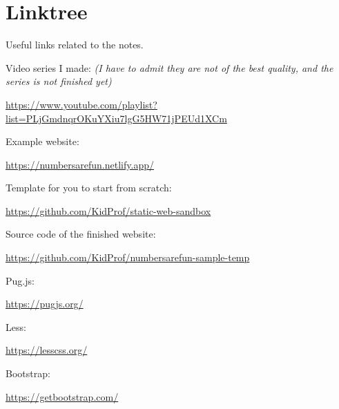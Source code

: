 \newpage
\section{Linktree}

Useful links related to the notes.
\vspace{6mm}

Video series I made: \textit{(I have to admit they are not of the best quality, and the series is not finished yet)}

\url{https://www.youtube.com/playlist?list=PLjGmdnqrOKuYXiu7lgG5HW71jPEUd1XCm}
\vspace{6mm}

Example website:

\url{https://numbersarefun.netlify.app/}
\vspace{6mm}

Template for you to start from scratch:

\url{https://github.com/KidProf/static-web-sandbox}
\vspace{6mm}

Source code of the finished website:

\url{https://github.com/KidProf/numbersarefun-sample-temp}
\vspace{6mm}

Pug.js: 

\url{https://pugjs.org/}
\vspace{6mm}

Less: 

\url{https://lesscss.org/}
\vspace{6mm}

Bootstrap: 

\url{https://getbootstrap.com/}
\vspace{6mm}
